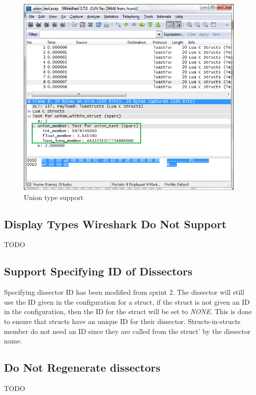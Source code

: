 \begin{figure}[ht]
	\center
	\includegraphics[width=\textwidth]{./sprints/img/wireshark_union}
	\caption{Union type support\label{fig:wsunion}}
\end{figure}



\subsection{Display Types Wireshark Do Not Support}
TODO

\subsection{Support Specifying ID of Dissectors}
Specifying dissector ID has been modified from sprint 2. The dissector will 
still use the ID given in the configuration for a struct, if the struct is not 
given an ID in the configuration, then the ID for the struct will be set to 
\emph{NONE}. This is done to ensure that structs have an unique ID for their 
dissector. Structs-in-structs member do not need an ID since they are called 
from the struct' by the dissector name.

\subsection{Do Not Regenerate dissectors}
TODO

